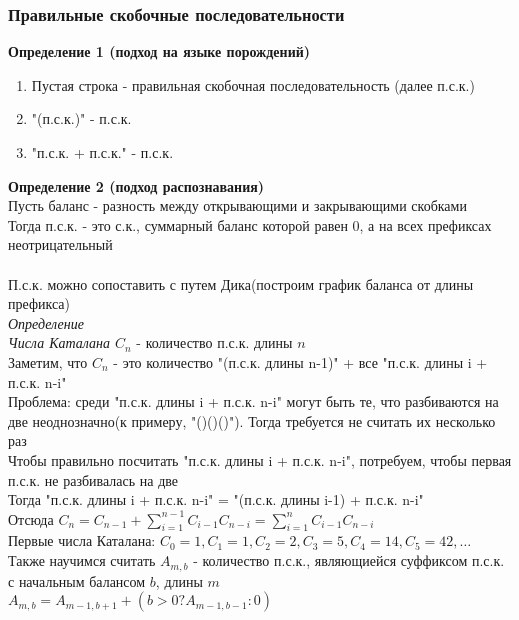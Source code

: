 \documentclass[12pt]{article}
\begin{document}
\subsubsection{Правильные скобочные последовательности}
\textbf{Определение 1 (подход на языке порождений)}
\begin{enumerate}
    \item Пустая строка - правильная скобочная последовательность (далее п.с.к.)
    \item "(п.с.к.)" - п.с.к.
    \item "п.с.к. + п.с.к." - п.с.к.
\end{enumerate}
\textbf{Определение 2 (подход распознавания)}\\
Пусть баланс - разность между открывающими и закрывающими скобками\\
Тогда п.с.к. - это с.к., суммарный баланс которой равен 0, а на всех префиксах неотрицательный\\\\
П.с.к. можно сопоставить с путем Дика(построим график баланса от длины префикса)\\
\textit{Определение}\\
\textit{Числа Каталана $C_n$} - количество п.с.к. длины $n$\\
Заметим, что $C_n$ - это количество "(п.с.к. длины n-1)" + все "п.с.к. длины i + п.с.к. n-i"\\
Проблема: среди "п.с.к. длины i + п.с.к. n-i" могут быть те, что разбиваются на две неоднозначно(к примеру, "()()()"). Тогда требуется не считать их несколько раз\\
Чтобы правильно посчитать "п.с.к. длины i + п.с.к. n-i", потребуем, чтобы первая п.с.к. не разбивалась на две\\
Тогда "п.с.к. длины i + п.с.к. n-i" = "(п.с.к. длины i-1) + п.с.к. n-i"\\
Отсюда $C_n = C_{n-1} + \sum_{i=1}^{n-1}C_{i-1}C_{n-i} = \sum_{i=1}^{n}C_{i-1}C_{n-i}$\\
Первые числа Каталана: $C_0 = 1, C_1 = 1, C_2 = 2, C_3 = 5, C_4 = 14, C_5 = 42, \ldots$\\
Также научимся считать $A_{m,b}$ - количество п.с.к., являющиейся суффиксом п.с.к. с начальным балансом $b$, длины $m$\\
$A_{m,b} = A_{m-1, b+1}+(b > 0 ? A_{m-1,b-1} : 0)$
\end{document}
